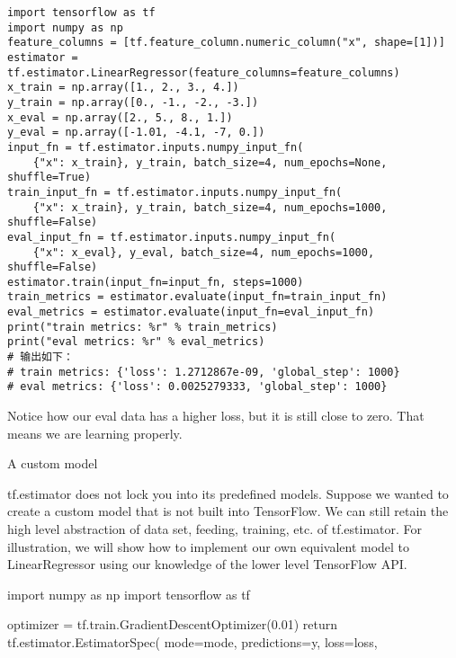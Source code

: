 \newpage
\begin{verbatim}
import tensorflow as tf
import numpy as np
feature_columns = [tf.feature_column.numeric_column("x", shape=[1])]
estimator = tf.estimator.LinearRegressor(feature_columns=feature_columns)
x_train = np.array([1., 2., 3., 4.])
y_train = np.array([0., -1., -2., -3.])
x_eval = np.array([2., 5., 8., 1.])
y_eval = np.array([-1.01, -4.1, -7, 0.])
input_fn = tf.estimator.inputs.numpy_input_fn(
    {"x": x_train}, y_train, batch_size=4, num_epochs=None, shuffle=True)
train_input_fn = tf.estimator.inputs.numpy_input_fn(
    {"x": x_train}, y_train, batch_size=4, num_epochs=1000, shuffle=False)
eval_input_fn = tf.estimator.inputs.numpy_input_fn(
    {"x": x_eval}, y_eval, batch_size=4, num_epochs=1000, shuffle=False)
estimator.train(input_fn=input_fn, steps=1000)
train_metrics = estimator.evaluate(input_fn=train_input_fn)
eval_metrics = estimator.evaluate(input_fn=eval_input_fn)
print("train metrics: %r" % train_metrics)
print("eval metrics: %r" % eval_metrics)
# 输出如下：
# train metrics: {'loss': 1.2712867e-09, 'global_step': 1000}
# eval metrics: {'loss': 0.0025279333, 'global_step': 1000}
\end{verbatim}

Notice how our eval data has a higher loss, but it is still close to zero. That means we are learning properly.

A custom model

tf.estimator does not lock you into its predefined models. Suppose we wanted to create a custom model that is not built into TensorFlow. We can still retain the high level abstraction of data set, feeding, training, etc. of tf.estimator. For illustration, we will show how to implement our own equivalent model to LinearRegressor using our knowledge of the lower level TensorFlow API.


import numpy as np
import tensorflow as tf

  optimizer = tf.train.GradientDescentOptimizer(0.01)
  return tf.estimator.EstimatorSpec(
      mode=mode,
      predictions=y,
      loss=loss,

